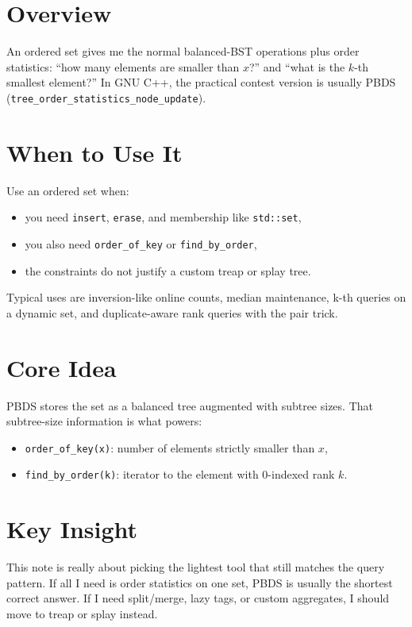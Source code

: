 \section*{Overview}

An ordered set gives me the normal balanced-BST operations plus order statistics: ``how many elements are smaller than
\(x\)?'' and ``what is the \(k\)-th smallest element?'' In GNU C++, the practical contest version is usually PBDS
(\texttt{tree\_order\_statistics\_node\_update}).

\section*{When to Use It}

Use an ordered set when:

\begin{itemize}
  \item you need \texttt{insert}, \texttt{erase}, and membership like \texttt{std::set},
  \item you also need \texttt{order\_of\_key} or \texttt{find\_by\_order},
  \item the constraints do not justify a custom treap or splay tree.
\end{itemize}

Typical uses are inversion-like online counts, median maintenance, k-th queries on a dynamic set, and duplicate-aware
rank queries with the pair trick.

\section*{Core Idea}

PBDS stores the set as a balanced tree augmented with subtree sizes. That subtree-size information is what powers:

\begin{itemize}
  \item \texttt{order\_of\_key(x)}: number of elements strictly smaller than \(x\),
  \item \texttt{find\_by\_order(k)}: iterator to the element with 0-indexed rank \(k\).
\end{itemize}

\section*{Key Insight}

This note is really about picking the lightest tool that still matches the query pattern. If all I need is order
statistics on one set, PBDS is usually the shortest correct answer. If I need split/merge, lazy tags, or custom
aggregates, I should move to treap or splay instead.

